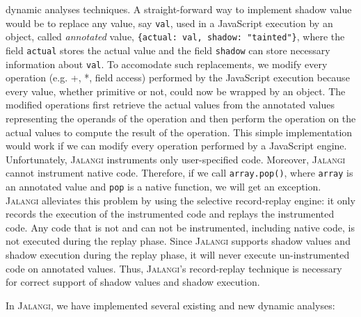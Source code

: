 \documentclass{sig-alternate}
\def\jalangi{\textsc{Jalangi}}
\begin{document}
\begin{enumerate}
  dynamic analyses techniques.  A straight-forward way to implement
  shadow value would be to replace any value, say \texttt{val}, used
  in a JavaScript execution by an object, called \emph{annotated}
  value, \texttt{\{actual: val, shadow: "tainted"\}}, where the field
  \texttt{actual} stores the actual value and the field
  \texttt{shadow} can store necessary information about \texttt{val}.
  To accomodate such replacements, we modify every operation (e.g. +,
  *, field access) performed by the JavaScript execution because every
  value, whether primitive or not, could now be wrapped by an object.
  The modified operations first retrieve the actual values from
  the annotated values representing the operands of the operation and
  then perform the operation on the actual values to compute the
  result of the operation.  %
  This simple implementation would work if we can modify every
  operation performed by a JavaScript engine.  Unfortunately,
  \jalangi{} instruments only user-specified code. Moreover,
  \jalangi{} cannot instrument native code.  Therefore, if we call
  \texttt{array.pop()}, where \texttt{array} is an annotated value and
  \texttt{pop} is a native function, we will get an exception.
  \jalangi{} alleviates this problem by using the selective
  record-replay engine: it only records the execution of the
  instrumented code and replays the instrumented code.  Any code that
  is not and can not be instrumented, including native code, is not
  executed during the replay phase.  Since \jalangi{} supports shadow
  values and shadow execution during the replay phase, it will never
  execute un-instrumented code on annotated values.  Thus, \jalangi's
  record-replay technique is necessary for correct support of shadow
  values and shadow execution.
\end{enumerate}

In \jalangi{}, we have implemented several existing and new dynamic
analyses:
\end{document}
